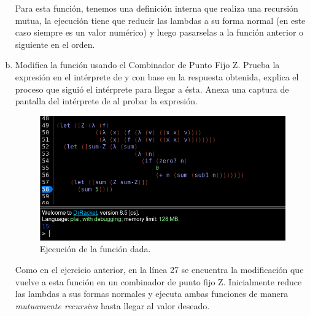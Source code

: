 \begin{enumerate}[a.]
Para esta función, tenemos una definición interna que realiza una recursión mutua,
la ejecución tiene que reducir las lambdas a su forma normal (en este caso siempre
es un valor numérico) y luego pasarselas a la función anterior o siguiente en el orden.
\newpage
\item Modifica la función usando el Combinador de Punto Fijo Z. Prueba la expresión en 
el intérprete de  y con base en la respuesta obtenida, explica el proceso que 
siguió el intérprete para llegar a ésta. Anexa una captura de pantalla del intérprete 
de  al probar la expresión.

\begin{figure}[h]
  \centering
  \includegraphics[scale=0.3]{./Sum-Z.png}
  \caption{Ejecución de la función dada.}
\end{figure}

Como en el ejercicio anterior, en la línea 27 se encuentra la modificación
que vuelve a esta función en un combinador de punto fijo Z. Inicialmente
reduce las lambdas a sus formas normales y ejecuta ambas funciones de manera
\textit{mutuamente recursiva} hasta llegar al valor deseado.
\end{enumerate}
